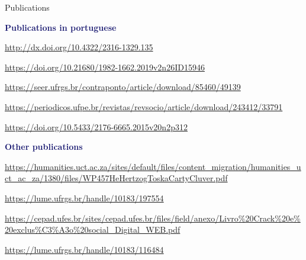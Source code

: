 \begin{rSection}{Publications}
\vspace{2em}

\vspace{1em}
\textcolor{MidnightBlue}{\textbf{Publications in portuguese}}
\vspace{1em}

\begin{etaremune}
\item {} \url{http://dx.doi.org/10.4322/2316-1329.135}
\item {} \url{https://doi.org/10.21680/1982-1662.2019v2n26ID15946 }
\item {} \url{https://seer.ufrgs.br/contraponto/article/download/85460/49139}
\item {} \url{https://periodicos.ufpe.br/revistas/revsocio/article/download/243412/33791}
\item {} \url{https://doi.org/10.5433/2176-6665.2015v20n2p312}
\end{etaremune}

\vspace{1em}
\textcolor{MidnightBlue}{\textbf{Other publications}}
\vspace{1em}

\begin{etaremune}
\item {} \url{https://humanities.uct.ac.za/sites/default/files/content_migration/humanities_uct_ac_za/1380/files/WP457HeHertzogToskaCartyCluver.pdf}
\item {} \url{https://lume.ufrgs.br/handle/10183/197554}
\item {}
\url{https://cepad.ufes.br/sites/cepad.ufes.br/files/field/anexo/Livro\%20Crack\%20e\%20exclus\%C3\%A3o\%20social_Digital_WEB.pdf}
\item {} \url{https://lume.ufrgs.br/handle/10183/116484}
\item {}

\end{etaremune}

\end{rSection}